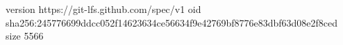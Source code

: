 version https://git-lfs.github.com/spec/v1
oid sha256:245776699ddcc052f14623634ce56634f9e42769bf8776e83dbf63d08e2f8ced
size 5566
